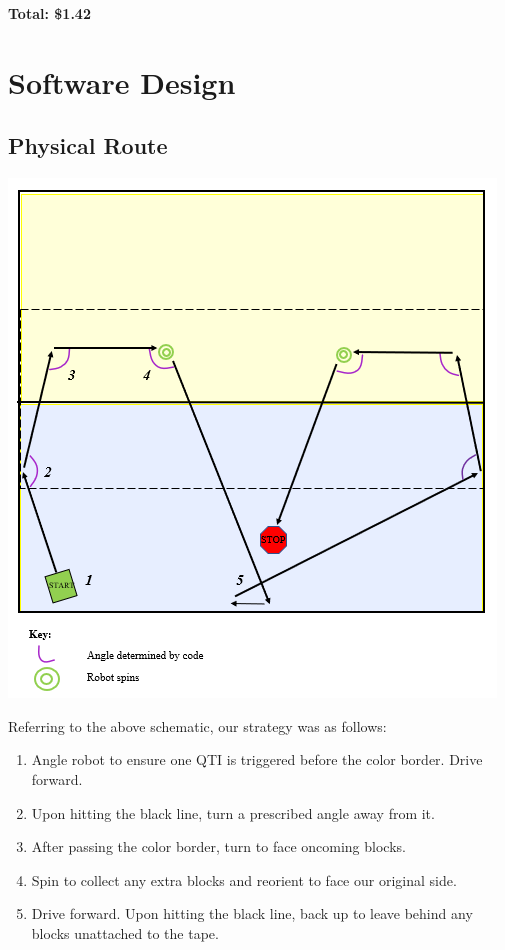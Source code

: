 \documentclass[11.5pt]{article}
\begin{document}
\begin{center}
\textbf{Total: \$1.42}
\end{center}


\section{Software Design}

\subsection{Physical Route}
\begin{center}
\includegraphics[scale=2.2]{Images/schematic}
\end{center}

\noindent
Referring to the above schematic, our strategy was as follows:
\begin{enumerate}
    \item Angle robot to ensure one QTI is triggered before the color border. Drive forward.
    \item Upon hitting the black line, turn a prescribed angle away from it.
    \item After passing the color border, turn to face oncoming blocks.
    \item Spin to collect any extra blocks and reorient to face our original side.
    \item Drive forward. Upon hitting the black line, back up to leave behind any blocks unattached to the tape.
\end{enumerate}
\end{document}
